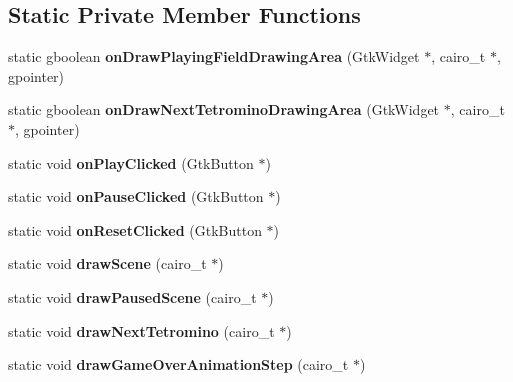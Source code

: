 \subsection*{Static Private Member Functions}
\begin{DoxyCompactItemize}
\item 
\mbox{\label{classTetreesUI_a829fc73fdc1f45fb567168f2c37ab012}} 
static gboolean {\bfseries on\+Draw\+Playing\+Field\+Drawing\+Area} (Gtk\+Widget $\ast$, cairo\+\_\+t $\ast$, gpointer)
\item 
\mbox{\label{classTetreesUI_aa775d6f3e3ca5c11ec3bb73e8dd7f62d}} 
static gboolean {\bfseries on\+Draw\+Next\+Tetromino\+Drawing\+Area} (Gtk\+Widget $\ast$, cairo\+\_\+t $\ast$, gpointer)
\item 
\mbox{\label{classTetreesUI_a9d2b1a8025a16aac4097850deedadd18}} 
static void {\bfseries on\+Play\+Clicked} (Gtk\+Button $\ast$)
\item 
\mbox{\label{classTetreesUI_afe0ff659354e4c6dfe6a7f2fce3ad0de}} 
static void {\bfseries on\+Pause\+Clicked} (Gtk\+Button $\ast$)
\item 
\mbox{\label{classTetreesUI_af80a44c26a4ce356e1f999c8a341197c}} 
static void {\bfseries on\+Reset\+Clicked} (Gtk\+Button $\ast$)
\item 
\mbox{\label{classTetreesUI_a357ae7240cc5f35b5d61244e7a6bcfe3}} 
static void {\bfseries draw\+Scene} (cairo\+\_\+t $\ast$)
\item 
\mbox{\label{classTetreesUI_a7d39f8caa75f5e755e3cebb0e05bb779}} 
static void {\bfseries draw\+Paused\+Scene} (cairo\+\_\+t $\ast$)
\item 
\mbox{\label{classTetreesUI_a9f4fa68c99e9d6146d9bdf2baa9db4d6}} 
static void {\bfseries draw\+Next\+Tetromino} (cairo\+\_\+t $\ast$)
\item 
\mbox{\label{classTetreesUI_a4d16e60b9a27bfbc2aac1deba09cc74c}} 
static void {\bfseries draw\+Game\+Over\+Animation\+Step} (cairo\+\_\+t $\ast$)
\item 
\mbox{\label{classTetreesUI_a5db6dc449dab49c7baa83f35a7909c0c}} 

\end{DoxyCompactItemize}
